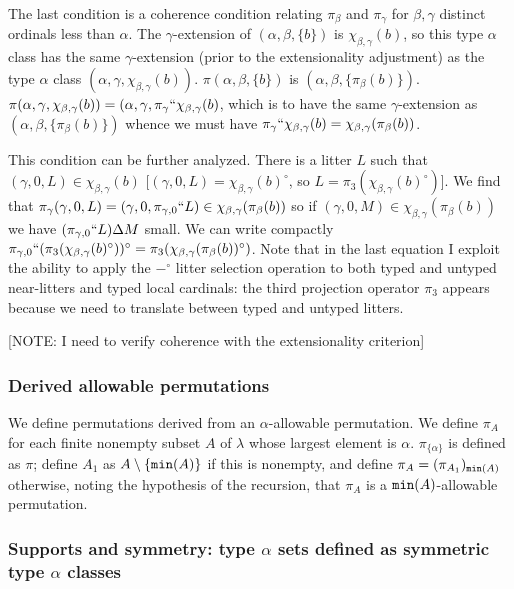 \documentclass[12pt]{article}
\begin{document}
  The last condition is a coherence condition relating $\pi_\beta$ and $\pi_\gamma$ for $\beta, \gamma$ distinct ordinals less than $\alpha$.
The $\gamma$-extension of $(\alpha,\beta,\{b\})$ is $\chi_{\beta,\gamma}(b)$, so this type $\alpha$ class has the same $\gamma$-extension (prior to the extensionality adjustment) as the type $\alpha$ class  $(\alpha,\gamma,\chi_{\beta,\gamma}(b))$.  $\pi(\alpha,\beta,\{b\})$ is $(\alpha,\beta,\{\pi_\beta(b)\})$.
$\pi(\alpha,\gamma,\chi_{\beta,\gamma}(b)) = (\alpha,\gamma,\pi_{\gamma}``\chi_{\beta,\gamma}(b)$, which is to have the same $\gamma$-extension as $(\alpha,\beta,\{\pi_\beta(b)\})$ whence we must have $\pi_{\gamma}``\chi_{\beta,\gamma}(b) = \chi_{\beta,\gamma}(\pi_\beta(b))$.

	This condition can be further analyzed.  There is a litter $L$ such that $(\gamma,0,L) \in \chi_{\beta,\gamma}(b)$ [$(\gamma,0,L)= \chi_{\beta,\gamma}(b)^\circ$, so $L=\pi_3( \chi_{\beta,\gamma}(b)^\circ)$].    We find that $\pi_\gamma(\gamma,0,L) = (\gamma,0,\pi_{\gamma,0}``L) \in \chi_{\beta,\gamma}(\pi_\beta(b))$ so  if $(\gamma,0,M) \in  \chi_{\beta,\gamma}(\pi_\beta(b))$ we have
$(\pi_{\gamma,0}``L )\Delta M$ small.  We can write compactly  $\pi_{\gamma,0}``(\pi_3(\chi_{\beta,\gamma}(b)^\circ)) ^{\circ}= \pi_3(\chi_{\beta,\gamma}(\pi_\beta(b))^\circ)$.  Note that in the last equation I exploit the ability to apply the $-^\circ$ litter selection operation to both typed and untyped near-litters and typed local cardinals:  the third projection operator $\pi_3$  appears because we need to translate between typed and untyped litters.

[NOTE:  I need to verify coherence with the extensionality criterion]

\subsubsection{Derived allowable permutations}

We define permutations derived from an $\alpha$-allowable permutation.  We define $\pi_A$ for each finite nonempty subset $A$ of $\lambda$ whose largest element is $\alpha$.  $\pi_{\{\alpha\}}$ is defined as $\pi$;  define $A_1$ as $A \setminus \{{\tt min}(A)\}$ if this is nonempty, and define $\pi_A = (\pi_{A_1})_{{\tt min}(A)}$ otherwise, noting the hypothesis of the recursion, that $\pi_A$ is a ${\tt min}(A)$-allowable permutation.

\subsubsection{Supports and symmetry:  type $\alpha$ sets defined as symmetric type $\alpha$ classes}
\end{document}

